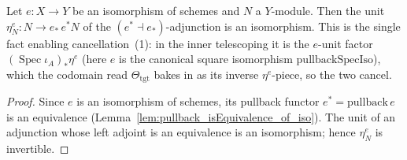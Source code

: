 
\begin{lemma}

  \label{lem:base_change_mate_inner_eCancel_eUnit}
  Let \(e : X \to Y\) be an isomorphism of schemes and \(N\) a \(Y\)-module. Then the unit
  \(\eta^{e}_{N} : N \to e_{*}\,e^{*}N\) of the \((e^{*} \dashv e_{*})\)-adjunction is an
  isomorphism. This is the single fact enabling cancellation~(1): in the inner telescoping it is
  the \(e\)-unit factor \((\operatorname{Spec}\iota_A)_{*}\eta^{e}\) (here \(e\) is the canonical
  square isomorphism \(\mathrm{pullbackSpecIso}\)), which the codomain read
  \(\Theta_{\mathrm{tgt}}\) bakes in as its inverse \(\eta^{e}\)-piece, so the two cancel.
\end{lemma}
\begin{proof}
  Since \(e\) is an isomorphism of schemes, its pullback functor \(e^{*} = \mathrm{pullback}\,e\)
  is an equivalence (Lemma~\ref{lem:pullback_isEquivalence_of_iso}). The unit of an adjunction whose
  left adjoint is an equivalence is an isomorphism; hence \(\eta^{e}_{N}\) is invertible.
\end{proof}

